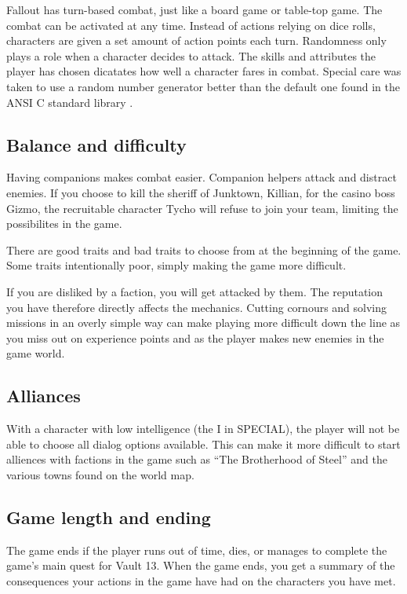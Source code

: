 Fallout has turn-based combat, just like a board game or table-top game. The combat can be activated at any time. Instead of actions relying on dice rolls, characters are given a set amount of action points each turn. Randomness only plays a role when a character decides to attack. The skills and attributes the player has chosen dicatates how well a character fares in combat. Special care was taken to use a random number generator better than the default one found in the ANSI C standard library \autocite{timrandom}.

\subsection{Balance and difficulty}

Having companions makes combat easier. Companion helpers attack and distract enemies. If you choose to kill the sheriff of Junktown, Killian, for the casino boss Gizmo, the recruitable character Tycho will refuse to join your team, limiting the possibilites in the game.

There are good traits and bad traits to choose from at the beginning of the game. Some traits intentionally poor, simply making the game more difficult.

If you are disliked by a faction, you will get attacked by them. The reputation you have therefore directly affects the mechanics. Cutting cornours and solving missions in an overly simple way can make playing more difficult down the line as you miss out on experience points and as the player makes new enemies in the game world.

\subsection{Alliances}

With a character with low intelligence (the I in SPECIAL), the player will not be able to choose all dialog options available. This can make it more difficult to start alliences with factions in the game such as ``The Brotherhood of Steel'' and the various towns found on the world map.

\subsection{Game length and ending}

The game ends if the player runs out of time, dies, or manages to complete the game's main quest for Vault 13. When the game ends, you get a summary of the consequences your actions in the game have had on the characters you have met.

